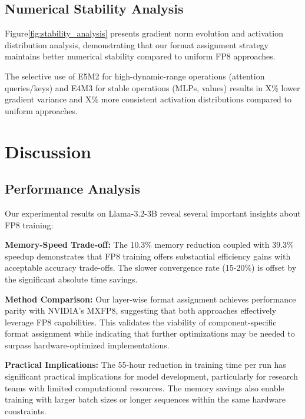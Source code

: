 \documentclass[conference]{IEEEtran}
\begin{document}
\subsection{Numerical Stability Analysis}

Figure\ref{fig:stability_analysis} presents gradient norm evolution and activation distribution analysis, demonstrating that our format assignment strategy maintains better numerical stability compared to uniform FP8 approaches.


The selective use of E5M2 for high-dynamic-range operations (attention queries/keys) and E4M3 for stable operations (MLPs, values) results in X\% lower gradient variance and X\% more consistent activation distributions compared to uniform approaches.

\section{Discussion}

\subsection{Performance Analysis}

Our experimental results on Llama-3.2-3B reveal several important insights about FP8 training:

\textbf{Memory-Speed Trade-off:} The 10.3\% memory reduction coupled with 39.3\% speedup demonstrates that FP8 training offers substantial efficiency gains with acceptable accuracy trade-offs. The slower convergence rate (15-20\%) is offset by the significant absolute time savings.

\textbf{Method Comparison:} Our layer-wise format assignment achieves performance parity with NVIDIA's MXFP8, suggesting that both approaches effectively leverage FP8 capabilities. This validates the viability of component-specific format assignment while indicating that further optimizations may be needed to surpass hardware-optimized implementations.

\textbf{Practical Implications:} The 55-hour reduction in training time per run has significant practical implications for model development, particularly for research teams with limited computational resources. The memory savings also enable training with larger batch sizes or longer sequences within the same hardware constraints.
\end{document}
